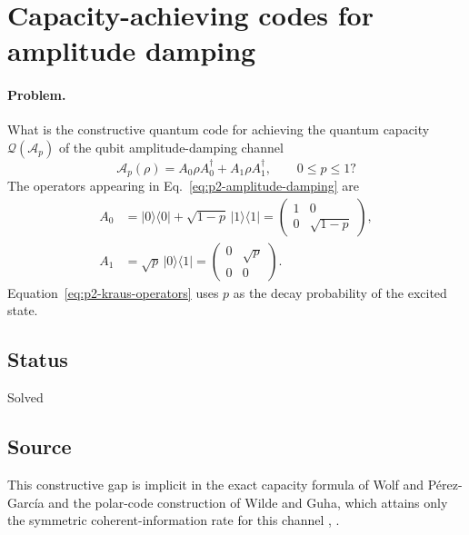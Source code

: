 \section{Capacity-achieving codes for amplitude damping}
\label{sec:problem-2}

\paragraph{Problem.}
What is the constructive quantum code for achieving the quantum capacity
$\mathcal{Q}(\mathcal A_p)$ of the qubit amplitude-damping channel
\begin{equation}
  \mathcal A_p(\rho)=A_0\rho A_0^\dagger+A_1\rho A_1^\dagger,
  \qquad 0\le p\le1?
  \label{eq:p2-amplitude-damping}
\end{equation}
The operators appearing in Eq.~\eqref{eq:p2-amplitude-damping} are
\begin{equation}
  \begin{aligned}
    A_0&=\lvert0\rangle\!\langle0\rvert
         +\sqrt{1-p}\,\lvert1\rangle\!\langle1\rvert
       =\begin{pmatrix}1&0\\0&\sqrt{1-p}\end{pmatrix},\\
    A_1&=\sqrt p\,\lvert0\rangle\!\langle1\rvert
       =\begin{pmatrix}0&\sqrt p\\0&0\end{pmatrix}.
  \end{aligned}
  \label{eq:p2-kraus-operators}
\end{equation}
Equation~\eqref{eq:p2-kraus-operators} uses $p$ as the decay probability of
the excited state.

\subsection*{Status}

Solved

\subsection*{Source}

This constructive gap is implicit in the exact capacity formula of Wolf and
P\'erez-Garc\'ia and the polar-code construction of Wilde and Guha, which
attains only the symmetric coherent-information rate for this channel
,
.

